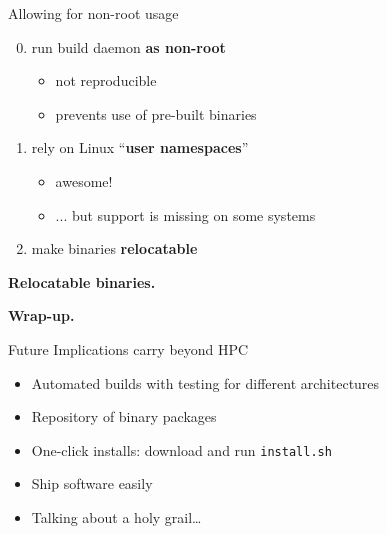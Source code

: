 \documentclass{beamer}
\newcommand{\highlight}[1]{\alert{\textbf{#1}}}
\begin{document}
\begin{frame}{Allowing for non-root usage}

  \Large{
    \begin{enumerate}
      \setcounter{enumi}{-1}
    \item {run build daemon \highlight{as non-root}
      \begin{itemize}
        \item<2-> not reproducible
        \item<2-> prevents use of pre-built binaries
    \end{itemize}}
    \item {rely on Linux ``\highlight{user namespaces}''
      \begin{itemize}
        \item<3-> awesome!
        \item<3-> ... but support is missing on some systems
    \end{itemize}}
    \item make binaries \highlight{relocatable}
    \end{enumerate}
  }
\end{frame}

\begin{frame}
  \Huge{\textbf{Relocatable binaries.}}
\end{frame}



\begin{frame}[plain]
  \Huge{\textbf{Wrap-up.}}
\end{frame}

\begin{frame}{Future}
  Implications carry beyond HPC
  \\
  \begin{itemize}
  \item Automated builds with testing for different architectures
  \item Repository of binary packages
  \item One-click installs: download and run \texttt{install.sh}
  \item Ship software easily
  \item Talking about a holy grail\ldots
  \end{itemize}
\end{frame}
\end{document}
